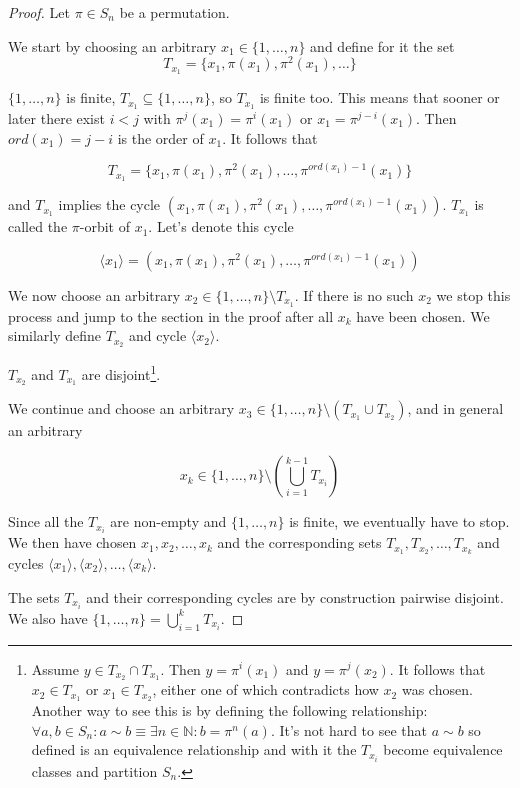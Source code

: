 \begin{proof}
Let $\pi \in S_n$ be a permutation.

We start by choosing an arbitrary $x_1 \in \{1, \ldots, n\}$ and define for it the set 
$$
T_{x_1} = \{x_1, \pi(x_1), \pi^2(x_1), \ldots\}
$$

$\{1, \ldots, n\}$ is finite, $T_{x_1} \subseteq \{1, \ldots, n\}$, so $T_{x_1}$ is finite too. This means that sooner or later there exist $i < j$ with $\pi^j(x_1)=\pi^i(x_1)$ or $x_1=\pi^{j-i}(x_1)$. Then $ord(x_1)=j-i$ is the order of $x_1$. It follows that 

$$
T_{x_1} = \{x_1, \pi(x_1), \pi^2(x_1), \ldots, \pi^{ord(x_1)-1}(x_1)\}
$$

and $T_{x_1}$ implies the cycle $(x_1, \pi(x_1), \pi^2(x_1), \ldots, \pi^{ord(x_1)-1}(x_1))$. $T_{x_1}$ is called the $\pi$-orbit of $x_1$. Let's denote this cycle

$$
\langle x_1 \rangle = (x_1, \pi(x_1), \pi^2(x_1), \ldots, \pi^{ord(x_1)-1}(x_1))
$$

We now choose an arbitrary $x_2 \in \{1, \ldots, n\} \setminus T_{x_1}$. If there is no such $x_2$ we stop this process and jump to the  section in the proof after all $x_k$ have been chosen. We similarly define $T_{x_2}$ and cycle $\langle x_2 \rangle$.

$T_{x_2}$ and $T_{x_1}$ are disjoint\footnote{Assume $y \in T_{x_2} \cap T_{x_1}$. Then $y=\pi^i(x_1)$ and $y=\pi^j(x_2)$. It follows that $x_2 \in T_{x_1}$ or $x_1 \in T_{x_2}$, either one of which contradicts how $x_2$ was chosen. Another way to see this is by defining the following relationship: $\forall a, b \in S_n: a \sim b \equiv \exists n \in \mathbb{N}: b = \pi^n(a)$. It's not hard to see that $a \sim b$ so defined is an equivalence relationship and with it the $T_{x_i}$ become equivalence classes and partition $S_n$.}.

We continue and choose an arbitrary $x_3 \in \{1, \ldots, n\} \setminus (T_{x_1} \cup T_{x_2})$, and in general an arbitrary

$$
x_k \in \{1, \ldots, n\} \setminus (\bigcup^{k-1}_{i=1} T_{x_i})
$$

Since all the $T_{x_i}$ are non-empty and $\{1, \ldots, n\}$ is finite, we eventually have to stop. We then have chosen $x_1, x_2, \ldots, x_k$ and the corresponding sets $T_{x_1}, T_{x_2}, \ldots, T_{x_k}$ and cycles $\langle x_1 \rangle, \langle x_2 \rangle, \ldots, \langle x_k \rangle$.

The sets $T_{x_i}$ and their corresponding cycles are by construction pairwise disjoint. We also have $\{1, \ldots, n\} = \bigcup^{k}_{i=1} T_{x_i}$.


\end{proof}
